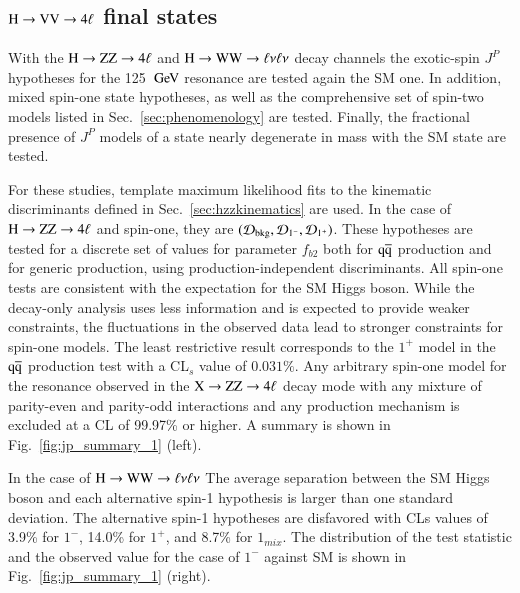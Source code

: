 \subsection{$\mathrm{H}\to\mathrm{V}\mathrm{V}\to4\ell$ final states}
\label{sec:exotic_h4l}

With the $\mathrm{H}\to\mathrm{Z}\mathrm{Z}\to4\ell$ and $\mathrm{H}\to\mathrm{W}\mathrm{W}\to\ell\nu\ell\nu$ decay channels the exotic-spin
$J^P$ hypotheses for the 125 $\,\mathrm{Ge\hspace{-.08em}V}$ resonance are tested again the SM
one. In addition, mixed spin-one state hypotheses, as well as the
comprehensive set of spin-two models listed in
Sec.~\ref{sec:phenomenology} are tested. Finally, the fractional
presence of $J^P$ models of a state nearly degenerate in mass with the
SM state are tested.

For these studies, template maximum likelihood fits to the kinematic
discriminants defined in Sec.~\ref{sec:hzzkinematics} are used.  In
the case of $\mathrm{H}\to\mathrm{Z}\mathrm{Z}\to4\ell$ and spin-one, they are
$({\cal D}_{\rm bkg},{\cal D}_{1^-},{\cal D}_{1^+})$. These hypotheses are tested for a
discrete set of values for parameter $f_{b2}$ both for $\mathrm{\mathrm{q}\mathrm{\overline{q}}}$
production and for generic production, using production-independent
discriminants. All spin-one tests are consistent with the expectation
for the SM Higgs boson.  While the decay-only analysis uses less
information and is expected to provide weaker constraints, the
fluctuations in the observed data lead to stronger constraints for
spin-one models.  The least restrictive result corresponds to the
$1^+$ model in the $\mathrm{\mathrm{q}\mathrm{\overline{q}}}$ production test with a CL$_s$ value of
$0.031\%$. Any arbitrary spin-one model for the resonance observed in
the $\mathrm{X}\to \mathrm{Z}\mathrm{Z}\to 4\ell$ decay mode with any mixture of parity-even
and parity-odd interactions and any production mechanism is excluded
at a CL of 99.97\% or higher. A summary is shown in
Fig.~\ref{fig:jp_summary_1} (left).

In the case of $\mathrm{H}\to\mathrm{W}\mathrm{W}\to\ell\nu\ell\nu$ The average separation between the SM Higgs
boson and each alternative spin-1 hypothesis is larger than one
standard deviation. The alternative spin-1 hypotheses are disfavored
with CLs values of 3.9\% for $1^-$, 14.0\% for $1^{+}$, and 8.7\% for
$1_{mix}$. The distribution of the test statistic and the observed
value for the case of $1^-$ against SM is shown in
Fig.~\ref{fig:jp_summary_1} (right).



